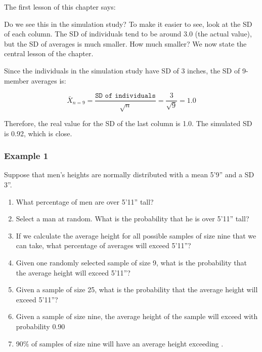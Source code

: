 \documentclass[11pt]{book}\usepackage[]{graphicx}\usepackage[]{color}
\begin{document}
The first lesson of this chapter says:


Do we see this in the simulation study?  To make it easier to see, look at the SD of each column.  The SD of individuals tend to be around 3.0 (the actual value), but the SD of averages is much smaller.  How much smaller?  We now state the central lesson of the chapter.


Since the individuals in the simulation study have SD of 3 inches, the SD of 9-member averages is:

\begin{equation*}
\bar{X}_{n=9} = \frac{\texttt{SD of individuals}}{\sqrt{n} } = \frac{3}{\sqrt{9}} = 1.0 
\end{equation*}

Therefore, the real value for the SD of the last column is 1.0.  The simulated SD is 0.92, which is close.

\subsubsection{Example 1}

Suppose that men's heights are normally distributed with a mean 5'9'' and a SD 3''.
  
  \begin{enumerate}
  \item What percentage of men are over 5'11'' tall?
  \item Select a man at random.  What is the probability that he is over 5'11'' tall?
  \item If we calculate the average height for all possible samples of size nine that we can take, what percentage of averages will exceed 5'11''?
  \item Given one randomly selected sample of size 9, what is the probability that the average height will exceed 5'11''?
  \item Given a sample of size 25, what is the probability that the average height will exceed 5'11''?
  \item Given a sample of size nine, the average height of the sample will exceed \underline{\phantom{xxxxxxxx}} with probability 0.90
  \item 90\% of samples of size nine will have an average height exceeding \underline{\phantom{xxxxxxxx}}.
  \end{enumerate}
\end{document}
